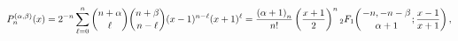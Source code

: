 \[\mathop{P^{(\alpha,\beta)}_{n}\/}\nolimits\!\left(x\right)=2^{-n}\sum_{\ell=0}%
^{n}\binom{n+\alpha}{\ell}\binom{n+\beta}{n-\ell}(x-1)^{n-\ell}(x+1)^{\ell}=%
\frac{\left(\alpha+1\right)_{n}}{n!}\left(\frac{x+1}{2}\right)^{n}\mathop{{{}_%
{2}F_{1}}\/}\nolimits\!\left({-n,-n-\beta\atop\alpha+1};\frac{x-1}{x+1}\right),\]